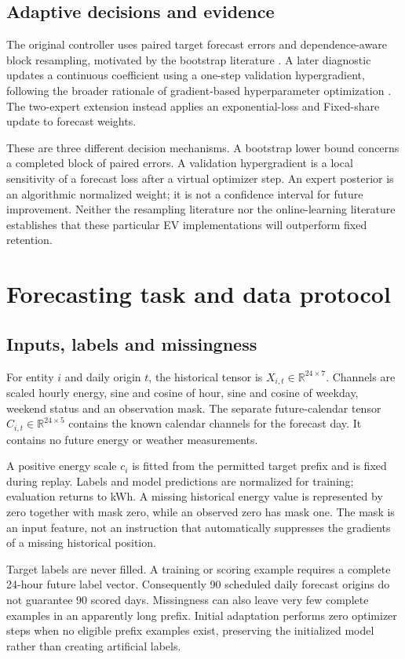 \documentclass[pdflatex,iicol,sn-mathphys-num]{sn-jnl}
\begin{document}
\subsection{Adaptive decisions and evidence}
The original controller uses paired target forecast errors and dependence-aware block resampling, motivated by the bootstrap literature \cite{kunsch1989}. A later diagnostic updates a continuous coefficient using a one-step validation hypergradient, following the broader rationale of gradient-based hyperparameter optimization \cite{luketina2016}. The two-expert extension instead applies an exponential-loss and Fixed-share update \cite{herbster1998} to forecast weights.

These are three different decision mechanisms. A bootstrap lower bound concerns a completed block of paired errors. A validation hypergradient is a local sensitivity of a forecast loss after a virtual optimizer step. An expert posterior is an algorithmic normalized weight; it is not a confidence interval for future improvement. Neither the resampling literature nor the online-learning literature establishes that these particular EV implementations will outperform fixed retention.

\section{Forecasting task and data protocol}
\subsection{Inputs, labels and missingness}
For entity $i$ and daily origin $t$, the historical tensor is $X_{i,t}\in\mathbb R^{24\times7}$. Channels are scaled hourly energy, sine and cosine of hour, sine and cosine of weekday, weekend status and an observation mask. The separate future-calendar tensor $C_{i,t}\in\mathbb R^{24\times5}$ contains the known calendar channels for the forecast day. It contains no future energy or weather measurements.

A positive energy scale $c_i$ is fitted from the permitted target prefix and is fixed during replay. Labels and model predictions are normalized for training; evaluation returns to kWh. A missing historical energy value is represented by zero together with mask zero, while an observed zero has mask one. The mask is an input feature, not an instruction that automatically suppresses the gradients of a missing historical position.

Target labels are never filled. A training or scoring example requires a complete 24-hour future label vector. Consequently 90 scheduled daily forecast origins do not guarantee 90 scored days. Missingness can also leave very few complete examples in an apparently long prefix. Initial adaptation performs zero optimizer steps when no eligible prefix examples exist, preserving the initialized model rather than creating artificial labels.
\end{document}
